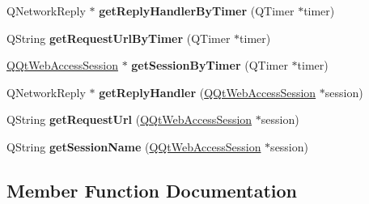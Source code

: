 \begin{DoxyCompactItemize}
\item 
\mbox{\label{class_q_qt_web_access_session_manager_a98ff810f5e96502bd97ef757ae5a46eb}} 
Q\+Network\+Reply $\ast$ {\bfseries get\+Reply\+Handler\+By\+Timer} (Q\+Timer $\ast$timer)
\item 
\mbox{\label{class_q_qt_web_access_session_manager_aebc04ca0b4130df662a79db1cf64b0d2}} 
Q\+String {\bfseries get\+Request\+Url\+By\+Timer} (Q\+Timer $\ast$timer)
\item 
\mbox{\label{class_q_qt_web_access_session_manager_ac4e5156e6fd98edf984625354b7b34cb}} 
\mbox{\hyperlink{class_q_qt_web_access_session}{Q\+Qt\+Web\+Access\+Session}} $\ast$ {\bfseries get\+Session\+By\+Timer} (Q\+Timer $\ast$timer)
\item 
\mbox{\label{class_q_qt_web_access_session_manager_aed404f821955a8cb7f41a8ea5a406870}} 
Q\+Network\+Reply $\ast$ {\bfseries get\+Reply\+Handler} (\mbox{\hyperlink{class_q_qt_web_access_session}{Q\+Qt\+Web\+Access\+Session}} $\ast$session)
\item 
\mbox{\label{class_q_qt_web_access_session_manager_a4caba25cf378c662ddd88110c1e8bed7}} 
Q\+String {\bfseries get\+Request\+Url} (\mbox{\hyperlink{class_q_qt_web_access_session}{Q\+Qt\+Web\+Access\+Session}} $\ast$session)
\item 
\mbox{\label{class_q_qt_web_access_session_manager_a667bc6c4a1de485df162b67f7e3c9d69}} 
Q\+String {\bfseries get\+Session\+Name} (\mbox{\hyperlink{class_q_qt_web_access_session}{Q\+Qt\+Web\+Access\+Session}} $\ast$session)
\end{DoxyCompactItemize}


\subsection{Member Function Documentation}
\mbox{\label{class_q_qt_web_access_session_manager_a5dd2bdd2a8f26690615a6a0a9523411f}} 

